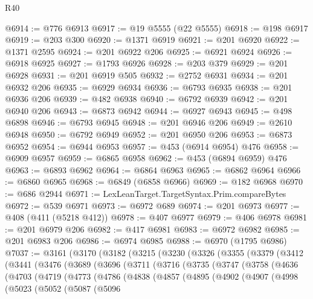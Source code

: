 \begin{lexlean}{R40}
\begin{coremodule}
@6914 := @776 @6913
@6917 := @19 @5555 (@22 @5555)
@6918 := @198 @6917
@6919 := @203 @300
@6920 := @1371 @6919
@6921 := @201 @6920
@6922 := @1371 @2595
@6924 := @201 @6922 @206
@6925 := @6921 @6924
@6926 := @6918 @6925
@6927 := @1793 @6926
@6928 := @203 @379
@6929 := @201 @6928
@6931 := @201 @6919 @505
@6932 := @2752 @6931
@6934 := @201 @6932 @206
@6935 := @6929 @6934
@6936 := @6793 @6935
@6938 := @201 @6936 @206
@6939 := @482 @6938
@6940 := @6792 @6939
@6942 := @201 @6940 @206
@6943 := @6873 @6942
@6944 := @6927 @6943
@6945 := @498 @6898
@6946 := @6793 @6945
@6948 := @201 @6946 @206
@6949 := @2610 @6948
@6950 := @6792 @6949
@6952 := @201 @6950 @206
@6953 := @6873 @6952
@6954 := @6944 @6953
@6957 := @453 (@6914 @6954) @476
@6958 := @6909 @6957
@6959 := @6865 @6958
@6962 := @453 (@6894 @6959) @476
@6963 := @6893 @6962
@6964 := @6864 @6963
@6965 := @6862 @6964
@6966 := @6860 @6965
@6968 := @6849 (@6858 @6966)
@6969 := @182 @6968
@6970 := @686 @2944
@6971 := LexLeanTarget.TargetSyntax.Prim.compareBytes
@6972 := @539 @6971
@6973 := @6972 @689
@6974 := @201 @6973
@6977 := @408 (@411 (@5218 @412))
@6978 := @407 @6977
@6979 := @406 @6978
@6981 := @201 @6979 @206
@6982 := @417 @6981
@6983 := @6972 @6982
@6985 := @201 @6983 @206
@6986 := @6974 @6985
@6988 := @6970 (@1795 @6986)
@7037 := @3161
    (@3170
      (@3182
        (@3215
          (@3230
            (@3326
              (@3355
                (@3379
                  (@3412
                    (@3441
                      (@3476
                        (@3689
                          (@3696
                            (@3711
                              (@3716
                                (@3735
                                  (@3747
                                    (@3758
                                      (@4636
                                        (@4703
                                          (@4719
                                            (@4773
                                              (@4786
                                                (@4838
                                                  (@4857
                                                    (@4895
                                                      (@4902
                                                        (@4907
                                                          (@4998
                                                            (@5023
                                                              (@5052
                                                                (@5087
                                                                  (@5096

\end{coremodule}
\end{lexlean}
